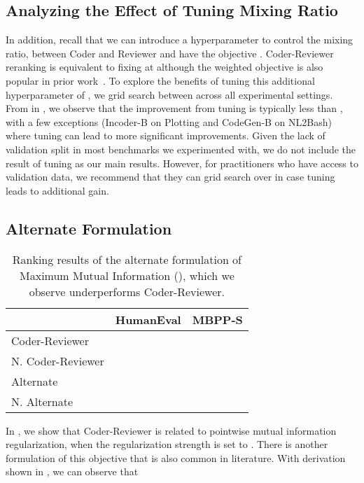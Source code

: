 \documentclass[nohyperref]{article}
\theoremstyle{plain}
\theoremstyle{definition}
\theoremstyle{remark}
\begin{document}
\subsection{Analyzing the Effect of Tuning Mixing Ratio }
\label{sec:app-alpha-tuning}

In addition, recall that we can introduce a hyperparameter to control the mixing ratio,  between Coder and Reviewer and have the objective .
Coder-Reviewer reranking is equivalent to fixing  at  although the weighted objective is also popular in prior work~\citep{mmi-diversity}.
To explore the benefits of tuning this additional hyperparameter of , we grid search between  across all experimental settings.
From  in , we observe that the improvement from tuning  is typically less than , with a few exceptions (Incoder-B on Plotting and CodeGen-B on NL2Bash) where tuning can lead to more significant improvements.
Given the lack of validation split in most benchmarks we experimented with, we do not include the result of tuning  as our main results.
However, for practitioners who have access to validation data, we recommend that they can grid search over  in case tuning leads to additional gain.


\subsection{Alternate Formulation}
\label{sec:app-alternate-formulation}
\begin{table}[]
\footnotesize
\centering
\begin{tabular}{lll}
\toprule
{} &               HumanEval &                  MBPP-S \\
\midrule
Coder-Reviewer       &   &            \\
N. Coder-Reviewer &   &   \\
\midrule
Alternate &  & \\
N. Alternate &  & \\
\bottomrule
\end{tabular} 

\caption{Ranking results of the alternate formulation of Maximum Mutual Information (), which we observe underperforms Coder-Reviewer.
}
\label{tab:alternate_table}
\vspace{-10pt}
\end{table}
In , we show that Coder-Reviewer is related to pointwise mutual information regularization, when the regularization strength  is set to .
There is another formulation of this objective that is also common in literature.
With derivation shown in , we can observe that 
\end{document}
